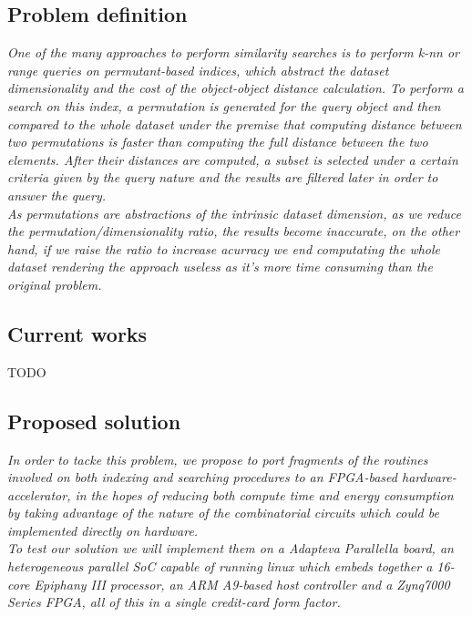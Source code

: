 \documentclass[11pt,letterpaper]{article}
\begin{document}
\subsection{Problem definition} 
\emph{One of the many approaches to perform similarity searches is to perform k-nn or range queries on permutant-based indices, which abstract the dataset dimensionality and the cost of the object-object distance calculation. To perform a search on this index, a permutation is generated for the query object and then compared to the whole dataset under the premise that computing distance between two permutations is faster than computing the full distance between the two elements. After their distances are computed, a subset is selected under a certain criteria given by the query nature and the results are filtered later in order to answer the query.
\\
As permutations are abstractions of the intrinsic dataset dimension, as we reduce the permutation/dimensionality ratio, the results become inaccurate, on the other hand, if we raise the ratio to increase acurracy we end computating the whole dataset rendering the approach useless as it's more time consuming than the original problem.
}

\subsection{Current works} 
TODO

\subsection{Proposed solution}
\emph{
    In order to tacke this problem, we propose to port fragments of the routines involved on both indexing and searching procedures to an FPGA-based hardware-accelerator, in the hopes of reducing both compute time and energy consumption by taking advantage of the nature of the combinatorial circuits which could be implemented directly on hardware.
\\
    To test our solution we will implement them on a Adapteva Parallella board, an heterogeneous parallel SoC capable of running linux which embeds together a 16-core Epiphany III processor, an ARM A9-based host controller and a Zynq7000 Series FPGA, all of this in a single credit-card form factor.
}
\end{document}
